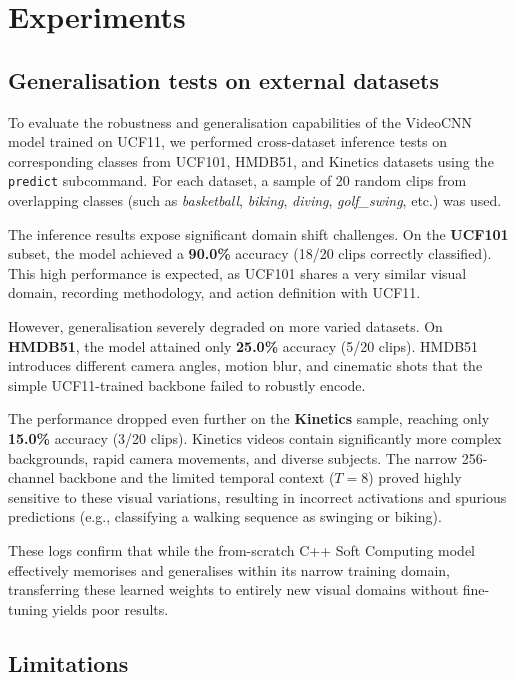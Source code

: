 \documentclass[11pt,a4paper]{article}
\begin{document}
\section{Experiments}
\label{sec:exp}

\subsection{Generalisation tests on external datasets}
\label{sec:exp_gen}

To evaluate the robustness and generalisation capabilities of the VideoCNN model trained on UCF11, we performed cross-dataset inference tests on corresponding classes from UCF101, HMDB51, and Kinetics datasets using the \texttt{predict} subcommand. For each dataset, a sample of 20 random clips from overlapping classes (such as \emph{basketball}, \emph{biking}, \emph{diving}, \emph{golf\_swing}, etc.) was used.

The inference results expose significant domain shift challenges. On the \textbf{UCF101} subset, the model achieved a \textbf{90.0\%} accuracy (18/20 clips correctly classified). This high performance is expected, as UCF101 shares a very similar visual domain, recording methodology, and action definition with UCF11.

However, generalisation severely degraded on more varied datasets. On \textbf{HMDB51}, the model attained only \textbf{25.0\%} accuracy (5/20 clips). HMDB51 introduces different camera angles, motion blur, and cinematic shots that the simple UCF11-trained backbone failed to robustly encode.

The performance dropped even further on the \textbf{Kinetics} sample, reaching only \textbf{15.0\%} accuracy (3/20 clips). Kinetics videos contain significantly more complex backgrounds, rapid camera movements, and diverse subjects. The narrow 256-channel backbone and the limited temporal context ($T=8$) proved highly sensitive to these visual variations, resulting in incorrect activations and spurious predictions (e.g., classifying a walking sequence as swinging or biking).

These logs confirm that while the from-scratch C++ Soft Computing model effectively memorises and generalises within its narrow training domain, transferring these learned weights to entirely new visual domains without fine-tuning yields poor results.

\subsection{Limitations}
\end{document}
